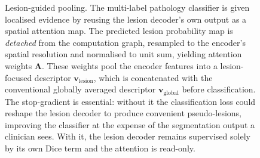 \begin{figure}[t]
{}
\caption{Lesion-guided pooling. The multi-label pathology classifier is given localised evidence
by reusing the lesion decoder's own output as a spatial attention map. The predicted lesion
probability map is \emph{detached} from the computation graph, resampled to the encoder's spatial
resolution and normalised to unit sum, yielding attention weights $\mathbf{A}$. These weights
pool the encoder features into a lesion-focused descriptor
$\mathbf{v}_{\text{lesion}}$, which is concatenated with the conventional globally averaged
descriptor $\mathbf{v}_{\text{global}}$ before classification. The stop-gradient is essential:
without it the classification loss could reshape the lesion decoder to produce convenient
pseudo-lesions, improving the classifier at the expense of the segmentation output a clinician
sees. With it, the lesion decoder remains supervised solely by its own Dice term and the
attention is read-only.}\label{fig:pooling}
\end{figure}

